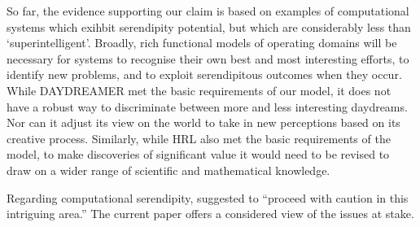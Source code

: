 So far, the evidence supporting our claim is based on examples of
computational systems which exihbit serendipity potential, but which
are considerably less than `superintelligent'.  Broadly, rich
functional models of operating domains will be necessary for systems
to recognise their own best and most interesting efforts, to identify
new problems, and to exploit serendipitous outcomes when they occur.
While {\sf DAYDREAMER} met the basic requirements of our model, it
does not have a robust way to discriminate between more and less
interesting daydreams.  Nor can it adjust its view on the world to
take in new perceptions based on its creative process.  Similarly,
while {\sf HRL} also met the basic requirements of the model, to make
discoveries of significant value it would need to be revised to draw
on a wider range of scientific and mathematical knowledge.

Regarding computational serendipity, \citet{pease2013discussion}
suggested to ``proceed with caution in this intriguing area.''  The
current paper offers a considered view of the issues at stake.

